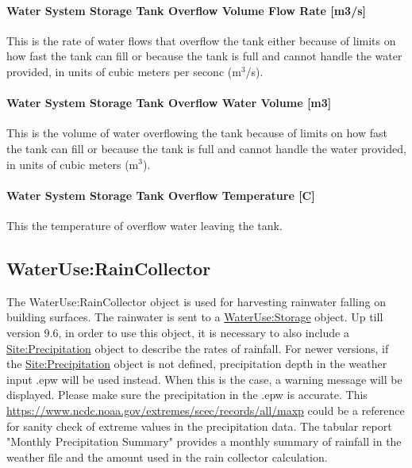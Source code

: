 \paragraph{Water System Storage Tank Overflow Volume Flow Rate {[}m3/s{]}}\label{water-system-storage-tank-overflow-volume-flow-rate-m3s}

This is the rate of water flows that overflow the tank either because of limits on how fast the tank can fill or because the tank is full and cannot handle the water provided, in units of cubic meters per seconc (m\(^{3}\)/s).

\paragraph{Water System Storage Tank Overflow Water Volume {[}m3{]}}\label{water-system-storage-tank-overflow-water-volume-m3}

This is the volume of water overflowing the tank because of limits on how fast the tank can fill or because the tank is full and cannot handle the water provided, in units of cubic meters (m\(^{3}\)).

\paragraph{Water System Storage Tank Overflow Temperature {[}C{]}}\label{water-system-storage-tank-overflow-temperature-c}

This the temperature of overflow water leaving the tank.

\subsection{WaterUse:RainCollector}\label{wateruseraincollector}

The WaterUse:RainCollector object is used for harvesting rainwater falling on
building surfaces. The rainwater is sent to a
\hyperref[waterusestorage]{WaterUse:Storage} object. Up till version 9.6, in
order to use this object, it is necessary to also include a
\hyperref[siteprecipitation]{Site:Precipitation} object to describe the rates of
rainfall. For newer versions, if the
\hyperref[siteprecipitation]{Site:Precipitation} object is not defined,
precipitation depth in the weather input .epw will be used instead. When this is
the case, a warning message will be displayed. Please make sure the
precipitation in the .epw is accurate. This \href{table by the State Climate
Extreme Committee}{https://www.ncdc.noaa.gov/extremes/scec/records/all/maxp}
could be a reference for sanity check of extreme values in the precipitation
data. The tabular report "Monthly Precipitation Summary" provides a monthly
summary of rainfall in the weather file and the amount used in the rain
collector calculation.

